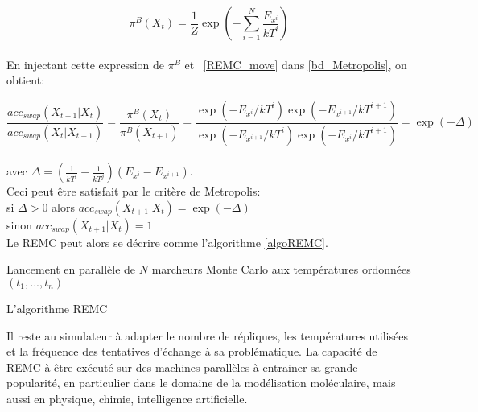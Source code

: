 \begin{equation}
\pi^B(X_t)=\frac{1}{Z} \exp(-\sum_{i=1}^N \frac{E_{x^i}}{kT^i})
\end{equation}\\
En injectant cette expression de $\pi^B$ et ~\ref{REMC_move} dans \ref{bd_Metropolis}, on obtient:


\begin{displaymath}
\frac{acc_{swap}(X_{t+1}|X_t)}{acc_{swap}(X_t|X_{t+1})} =\frac{\pi^B(X_t)}{\pi^B(X_{t+1})}
                                                     = \frac{ \exp(-E_{x^i}/kT^i) \exp(-E_{x^{i+1}}/kT^{i+1})}{\exp(-E_{x^{i+1}}/kT^i) \exp(-E_{x^i}/kT^{i+1})} 
                                                       = \exp(-\Delta) 
\end{displaymath}\\
avec $\Delta = (\frac{1}{kT^i} -\frac{1}{kT^j})(E_{x^i} - E_{x^{i+1}})$. \\
Ceci peut être satisfait par le critère de Metropolis:\\
si $\Delta >0$ alors $acc_{swap} (X_{t+1}|X_t) = \exp(- \Delta)$ \\
sinon $acc_{swap} (X_{t+1}|X_t) = 1$\\
Le REMC peut alors se décrire comme l'algorithme \ref{algoREMC}.

\begin{algorithm}

  Lancement en parallèle de $N$ marcheurs Monte Carlo aux températures ordonnées $(t_1,...,t_n)$ \;
\caption{L'algorithme REMC}\label{algoREMC}
\end{algorithm}


Il reste au simulateur à adapter le nombre de répliques, les températures utilisées et la fréquence des tentatives d'échange à sa problématique. La capacité de REMC à être exécuté sur des machines parallèles à entrainer sa grande popularité, en particulier dans le domaine de la modélisation moléculaire, mais aussi en physique, chimie, intelligence artificielle.

